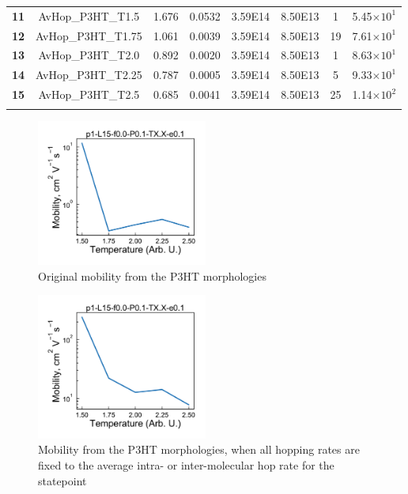 \documentclass[12pt]{article}
\def\ccg{\cellcolor{gray}}
\begin{document}
\begin{center}
\begin{adjustbox}{max width=\textwidth}
\begin{tabular}{| c | c | c | c | c | c | c | c |}
\hhline{--------}
\textbf{\ccg11}&\rule{0pt}{2.5ex}{\ccg}AvHop\_P3HT\_T1.5&{\ccg}1.676&{\ccg}0.0532&{\ccg}3.59E14&{\ccg}8.50E13&{\ccg}1&{\ccg}5.45$\times 10^{1}$\\
\textbf{12}&\rule{0pt}{2.5ex}AvHop\_P3HT\_T1.75&1.061&0.0039&3.59E14&8.50E13&19&7.61$\times 10^{1}$\\
\textbf{\ccg13}&\rule{0pt}{2.5ex}{\ccg}AvHop\_P3HT\_T2.0&{\ccg}0.892&{\ccg}0.0020&{\ccg}3.59E14&{\ccg}8.50E13&{\ccg}1&{\ccg}8.63$\times 10^{1}$\\
\textbf{14}&\rule{0pt}{2.5ex}AvHop\_P3HT\_T2.25&0.787&0.0005&3.59E14&8.50E13&5&9.33$\times 10^{1}$\\
\textbf{\ccg15}&\rule{0pt}{2.5ex}{\ccg}AvHop\_P3HT\_T2.5&{\ccg}0.685&{\ccg}0.0041&{\ccg}3.59E14&{\ccg}8.50E13&{\ccg}25&{\ccg}1.14$\times 10^{2}$\\
\hhline{--------}
\end{tabular}\label{table:mob}
\end{adjustbox}
\end{center}


\begin{figure}[h]\centering
	\includegraphics[width=0.5\textwidth]{Figures/mobilityHole.pdf}
    \caption{Original mobility from the P3HT morphologies}
	\label{fig:mobOrig}
\end{figure}


\begin{figure}[h]\centering
	\includegraphics[width=0.5\textwidth]{Figures/2hoursAvHopMobility.pdf}
    \caption{Mobility from the P3HT morphologies, when all hopping rates are fixed to the average intra- or inter-molecular hop rate for the statepoint}
	\label{fig:mobState}
\end{figure}
\end{document}
